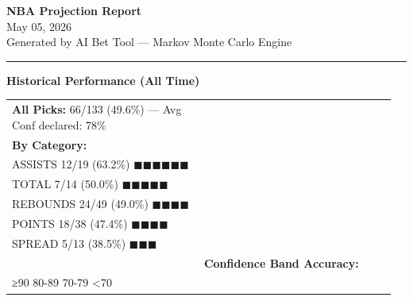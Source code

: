 \documentclass[10pt,a4paper]{article}
\begin{document}
\begin{center}
{\Huge\bfseries\textcolor{accent}{NBA Projection Report}}\\[4pt]
{\large\textcolor{accentgold}{May 05, 2026}}\\[2pt]
{\small\textcolor{midgray}{Generated by AI Bet Tool — Markov Monte Carlo Engine}}
\end{center}
\vspace{4pt}
\noindent\textcolor{accent}{\rule{\linewidth}{1.2pt}}
\vspace{6pt}

\begin{mdframed}[linecolor=accent,linewidth=1pt,backgroundcolor=lightgray,
  innertopmargin=6pt,innerbottommargin=6pt,innerrightmargin=5pt,innerleftmargin=5pt]
{\bfseries\textcolor{accent}{Historical Performance (All Time)}}\\[3pt]
\begin{tabular}{@{}p{0.48\linewidth}p{0.48\linewidth}@{}}
\textbf{All Picks:} 66/133 (49.6\%) \textcolor{midgray}{— Avg Conf declared: 78\%}\\
\vspace{2pt}
\textbf{By Category:}\\
  ASSISTS      12/19 (63.2\%) \textcolor{green!60!black}{$\blacksquare$$\blacksquare$$\blacksquare$$\blacksquare$$\blacksquare$$\blacksquare$}\\
  TOTAL        7/14 (50.0\%) \textcolor{green!60!black}{$\blacksquare$$\blacksquare$$\blacksquare$$\blacksquare$$\blacksquare$}\\
  REBOUNDS     24/49 (49.0\%) \textcolor{green!60!black}{$\blacksquare$$\blacksquare$$\blacksquare$$\blacksquare$}\\
  POINTS       18/38 (47.4\%) \textcolor{green!60!black}{$\blacksquare$$\blacksquare$$\blacksquare$$\blacksquare$}\\
  SPREAD       5/13 (38.5\%) \textcolor{green!60!black}{$\blacksquare$$\blacksquare$$\blacksquare$}\\
&
\textbf{Confidence Band Accuracy:}\\
  ≥90%
  80-89%
  70-79%
  <70%
\end{tabular}
\end{mdframed}
\vspace{6pt}
\end{document}
